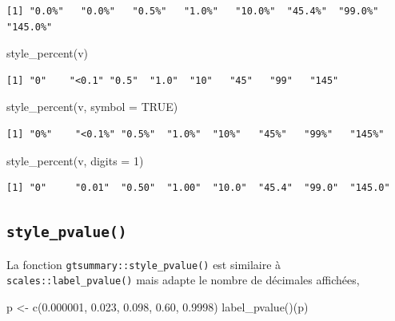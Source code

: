 \documentclass[
  letterpaper,
  DIV=11,
  numbers=noendperiod,
  oneside]{scrreprt}
\newenvironment{Shaded}{\begin{snugshade}}{\end{snugshade}}
\newcommand{\AttributeTok}[1]{\textcolor[rgb]{0.40,0.45,0.13}{#1}}
\newcommand{\ConstantTok}[1]{\textcolor[rgb]{0.56,0.35,0.01}{#1}}
\newcommand{\DecValTok}[1]{\textcolor[rgb]{0.68,0.00,0.00}{#1}}
\newcommand{\FloatTok}[1]{\textcolor[rgb]{0.68,0.00,0.00}{#1}}
\newcommand{\FunctionTok}[1]{\textcolor[rgb]{0.28,0.35,0.67}{#1}}
\newcommand{\NormalTok}[1]{\textcolor[rgb]{0.00,0.23,0.31}{#1}}
\newcommand{\OtherTok}[1]{\textcolor[rgb]{0.00,0.23,0.31}{#1}}
\begin{document}
\begin{verbatim}
[1] "0.0%"   "0.0%"   "0.5%"   "1.0%"   "10.0%"  "45.4%"  "99.0%"  "145.0%"
\end{verbatim}

\begin{Shaded}
\begin{Highlighting}[]
\FunctionTok{style\_percent}\NormalTok{(v)}
\end{Highlighting}
\end{Shaded}

\begin{verbatim}
[1] "0"    "<0.1" "0.5"  "1.0"  "10"   "45"   "99"   "145" 
\end{verbatim}

\begin{Shaded}
\begin{Highlighting}[]
\FunctionTok{style\_percent}\NormalTok{(v, }\AttributeTok{symbol =} \ConstantTok{TRUE}\NormalTok{)}
\end{Highlighting}
\end{Shaded}

\begin{verbatim}
[1] "0%"    "<0.1%" "0.5%"  "1.0%"  "10%"   "45%"   "99%"   "145%" 
\end{verbatim}

\begin{Shaded}
\begin{Highlighting}[]
\FunctionTok{style\_percent}\NormalTok{(v, }\AttributeTok{digits =} \DecValTok{1}\NormalTok{)}
\end{Highlighting}
\end{Shaded}

\begin{verbatim}
[1] "0"     "0.01"  "0.50"  "1.00"  "10.0"  "45.4"  "99.0"  "145.0"
\end{verbatim}

\hypertarget{style_pvalue}{%
\subsection{\texorpdfstring{\texttt{style\_pvalue()}}{style\_pvalue()}}\label{style_pvalue}}

La fonction \texttt{gtsummary::style\_pvalue()} est similaire à
\texttt{scales::label\_pvalue()} mais adapte le nombre de décimales
affichées,

\begin{Shaded}
\begin{Highlighting}[]
\NormalTok{p }\OtherTok{\textless{}{-}} \FunctionTok{c}\NormalTok{(}\FloatTok{0.000001}\NormalTok{, }\FloatTok{0.023}\NormalTok{, }\FloatTok{0.098}\NormalTok{, }\FloatTok{0.60}\NormalTok{, }\FloatTok{0.9998}\NormalTok{)}
\FunctionTok{label\_pvalue}\NormalTok{()(p)}
\end{Highlighting}
\end{Shaded}
\end{document}
